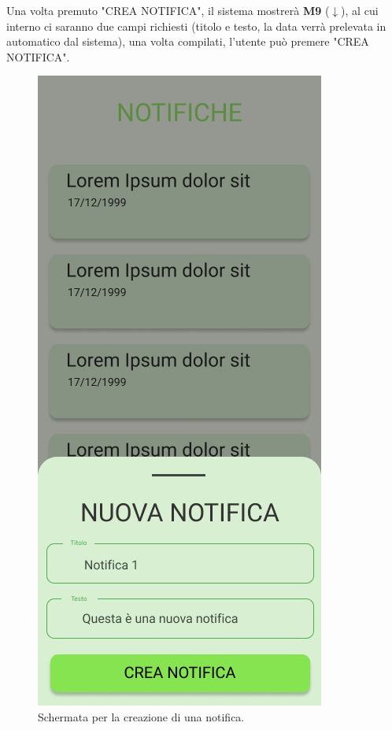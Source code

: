 \newpage
Una volta premuto "CREA NOTIFICA", il sistema mostrerà \textbf{M9} ($\downarrow$), al cui interno ci saranno due campi richiesti (titolo e testo, la data verrà prelevata in automatico dal sistema), una volta compilati, l'utente può premere "CREA NOTIFICA".
\begin{figure}[H]
  \centering
  \includegraphics[scale=0.6]{img/mock-up/create_notifications.png}
  \caption{Schermata per la creazione di una notifica.}
\end{figure}
\newpage
